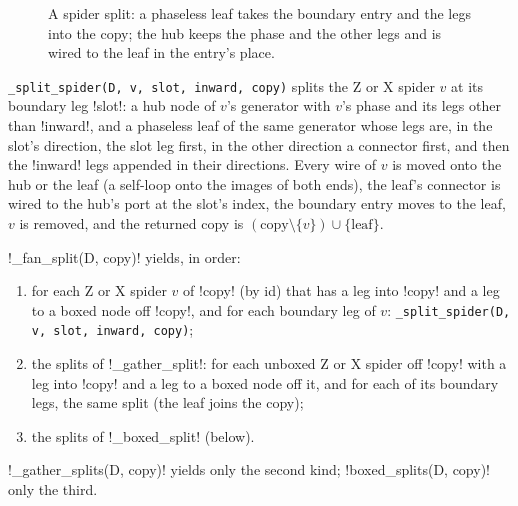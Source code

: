 \begin{figure}[H]
\centering
{}
\caption{A spider split: a phaseless leaf takes the boundary entry and the legs into the copy; the hub keeps the phase and the other legs and is wired to the leaf in the entry's place.}\label{fig:kernel-split}
\end{figure}

\texttt{\_\allowbreak{}split\_\allowbreak{}spider(\allowbreak{}D,\allowbreak{} v,\allowbreak{} slot,\allowbreak{} inward,\allowbreak{} copy)} splits the Z or X spider $v$ at its boundary leg \code!slot!: a hub node of $v$'s generator with $v$'s phase and its legs other than \code!inward!, and a phaseless leaf of the same generator whose legs are, in the slot's direction, the slot leg first, in the other direction a connector first, and then the \code!inward! legs appended in their directions. Every wire of $v$ is moved onto the hub or the leaf (a self-loop onto the images of both ends), the leaf's connector is wired to the hub's port at the slot's index, the boundary entry moves to the leaf, $v$ is removed, and the returned copy is $(\text{copy}\setminus\{v\})\cup\{\text{leaf}\}$.

\begin{signature}
\py!_fan_split(D, copy)! yields, in order:
\begin{enumerate}
\item for each Z or X spider $v$ of \code!copy! (by id) that has a leg into \code!copy! and a leg to a boxed node off \code!copy!, and for each boundary leg of $v$: \texttt{\_\allowbreak{}split\_\allowbreak{}spider(\allowbreak{}D,\allowbreak{} v,\allowbreak{} slot,\allowbreak{} inward,\allowbreak{} copy)};
\item the splits of \py!_gather_split!: for each unboxed Z or X spider off \code!copy! with a leg into \code!copy! and a leg to a boxed node off it, and for each of its boundary legs, the same split (the leaf joins the copy);
\item the splits of \py!_boxed_split! (below).
\end{enumerate}
\py!_gather_splits(D, copy)! yields only the second kind; \py!boxed_splits(D, copy)! only the third.
\end{signature}

